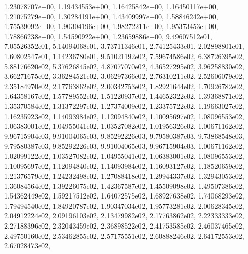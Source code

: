 \documentclass[letterpaper,10pt,english]{sphinxmanual}
\begin{document}
\begin{fulllineitems}
1.23078707e+00, 1.19434553e+00, 1.16425842e+00, 1.16450117e+00, 1.21075279e+00, 1.30284191e+00, 1.43409997e+00, 1.58846242e+00, 1.75539092e+00, 1.90304196e+00, 1.98272211e+00, 1.95373453e+00, 1.78866238e+00, 1.54590922e+00, 1.23659886e+00, 9.49607512e\sphinxhyphen{}01, 7.05526352e\sphinxhyphen{}01, 5.14094068e\sphinxhyphen{}01, 3.73711346e\sphinxhyphen{}01, 2.74125433e\sphinxhyphen{}01, 2.02898801e\sphinxhyphen{}01, 1.60802547e\sphinxhyphen{}01, 1.14236780e\sphinxhyphen{}01, 9.51021192e\sphinxhyphen{}02, 7.59674586e\sphinxhyphen{}02, 6.38726395e\sphinxhyphen{}02, 5.88176620e\sphinxhyphen{}02, 5.37626845e\sphinxhyphen{}02, 4.87077070e\sphinxhyphen{}02, 4.36527295e\sphinxhyphen{}02, 3.96258830e\sphinxhyphen{}02, 3.66271675e\sphinxhyphen{}02, 3.36284521e\sphinxhyphen{}02, 3.06297366e\sphinxhyphen{}02, 2.76310211e\sphinxhyphen{}02, 2.52606079e\sphinxhyphen{}02, 2.35184970e\sphinxhyphen{}02, 2.17763862e\sphinxhyphen{}02, 2.00342753e\sphinxhyphen{}02, 1.82921644e\sphinxhyphen{}02, 1.70926782e\sphinxhyphen{}02, 1.64358167e\sphinxhyphen{}02, 1.57789552e\sphinxhyphen{}02, 1.51220937e\sphinxhyphen{}02, 1.44652322e\sphinxhyphen{}02, 1.39368871e\sphinxhyphen{}02, 1.35370584e\sphinxhyphen{}02, 1.31372297e\sphinxhyphen{}02, 1.27374009e\sphinxhyphen{}02, 1.23375722e\sphinxhyphen{}02, 1.19663027e\sphinxhyphen{}02, 1.16235923e\sphinxhyphen{}02, 1.14093984e\sphinxhyphen{}02, 1.12094840e\sphinxhyphen{}02, 1.10095697e\sphinxhyphen{}02, 1.08096553e\sphinxhyphen{}02, 1.06383001e\sphinxhyphen{}02, 1.04955041e\sphinxhyphen{}02, 1.03527082e\sphinxhyphen{}02, 1.01956326e\sphinxhyphen{}02, 1.00671162e\sphinxhyphen{}02, 9.96715904e\sphinxhyphen{}03, 9.91004065e\sphinxhyphen{}03, 9.85292226e\sphinxhyphen{}03, 9.79580387e\sphinxhyphen{}03, 9.73868548e\sphinxhyphen{}03, 9.79580387e\sphinxhyphen{}03, 9.85292226e\sphinxhyphen{}03, 9.91004065e\sphinxhyphen{}03, 9.96715904e\sphinxhyphen{}03, 1.00671162e\sphinxhyphen{}02, 1.02099122e\sphinxhyphen{}02, 1.03527082e\sphinxhyphen{}02, 1.04955041e\sphinxhyphen{}02, 1.06383001e\sphinxhyphen{}02, 1.08096553e\sphinxhyphen{}02, 1.10095697e\sphinxhyphen{}02, 1.12094840e\sphinxhyphen{}02, 1.14093984e\sphinxhyphen{}02, 1.16093127e\sphinxhyphen{}02, 1.18520659e\sphinxhyphen{}02, 1.21376579e\sphinxhyphen{}02, 1.24232498e\sphinxhyphen{}02, 1.27088418e\sphinxhyphen{}02, 1.29944337e\sphinxhyphen{}02, 1.32943053e\sphinxhyphen{}02, 1.36084564e\sphinxhyphen{}02, 1.39226075e\sphinxhyphen{}02, 1.42367587e\sphinxhyphen{}02, 1.45509098e\sphinxhyphen{}02, 1.49507386e\sphinxhyphen{}02, 1.54362449e\sphinxhyphen{}02, 1.59217512e\sphinxhyphen{}02, 1.64072575e\sphinxhyphen{}02, 1.68927638e\sphinxhyphen{}02, 1.74068293e\sphinxhyphen{}02, 1.79494540e\sphinxhyphen{}02, 1.84920787e\sphinxhyphen{}02, 1.90347034e\sphinxhyphen{}02, 1.95773281e\sphinxhyphen{}02, 2.00628345e\sphinxhyphen{}02, 2.04912224e\sphinxhyphen{}02, 2.09196103e\sphinxhyphen{}02, 2.13479982e\sphinxhyphen{}02, 2.17763862e\sphinxhyphen{}02, 2.22333333e\sphinxhyphen{}02, 2.27188396e\sphinxhyphen{}02, 2.32043459e\sphinxhyphen{}02, 2.36898522e\sphinxhyphen{}02, 2.41753585e\sphinxhyphen{}02, 2.46037465e\sphinxhyphen{}02, 2.49750160e\sphinxhyphen{}02, 2.53462855e\sphinxhyphen{}02, 2.57175551e\sphinxhyphen{}02, 2.60888246e\sphinxhyphen{}02, 2.64172553e\sphinxhyphen{}02, 2.67028473e\sphinxhyphen{}02, 
\end{fulllineitems}
\end{document}
